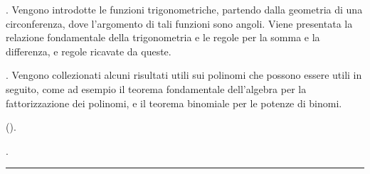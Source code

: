 \documentclass[letterpaper,10pt,italian]{jupyterBook}
\begin{document}
\sphinxAtStartPar
{\hyperref[\detokenize{ch/trigonometry:math-hs-trigonometry}]{}} . Vengono introdotte le funzioni trigonometriche, partendo dalla geometria di una circonferenza, dove l’argomento di tali funzioni sono angoli. Viene presentata la relazione fondamentale della trigonometria e le regole per la somma e la differenza, e regole ricavate da queste.

\sphinxAtStartPar
{\hyperref[\detokenize{ch/precalculus/polynomials:math-hs-precalculus-polynomials}]{}}     \sphinxstyleemphasis{)}. Vengono collezionati alcuni risultati utili sui polinomi che possono essere utili in seguito, come ad esempio il teorema fondamentale dell’algebra per la fattorizzazione dei polinomi, e il teorema binomiale per le potenze di binomi.

\sphinxAtStartPar
{\hyperref[\detokenize{ch/precalculus/multivariable-real-fun:math-hs-precalculus-multivariable-real-fun}]{}} (). 

\sphinxAtStartPar
{\hyperref[\detokenize{ch/algebra/complex-algebra:math-hs-algebra-complex}]{}}     \sphinxstyleemphasis{)}.




\bigskip\hrule\bigskip


\sphinxstepscope
\end{document}
